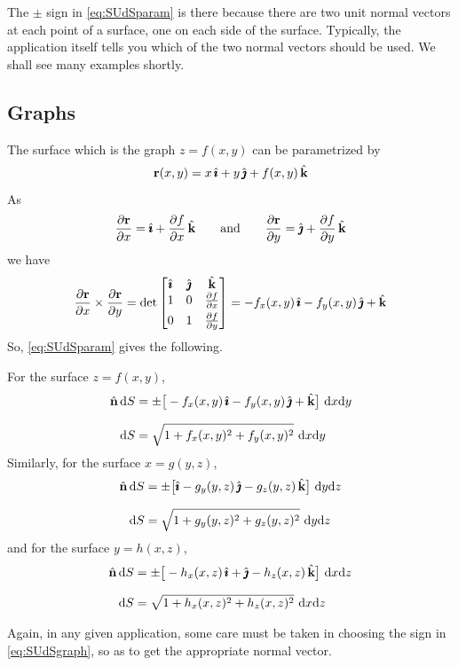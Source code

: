 \noindent
The $\pm$ sign in \eqref{eq:SUdSparam} is there because there are
two unit normal vectors at each point of a surface, one on each side of the
surface. Typically, the application itself tells you 
which of the two normal vectors should be used. We shall see many examples shortly.

\subsection{Graphs}
The surface which is the graph $z = f(x,y)$ can be parametrized
by 
\begin{equation*}
\mathbf{r}(x,y) = x\,\hat{\pmb{\imath}} + y\,\hat{\pmb{\jmath}} + f(x,y)\,\hat{\mathbf{k}}
\end{equation*} 
As
\begin{align*}
\frac{\partial\mathbf{r}}{\partial x}  
       = \hat{\pmb{\imath}} + \frac{\partial f}{\partial x}\,\hat{\mathbf{k}} \qquad\text{and}\qquad
\frac{\partial\mathbf{r}}{\partial y}  
       = \hat{\pmb{\jmath}} + \frac{\partial f}{\partial y}\,\hat{\mathbf{k}} 
\end{align*}
we have
\begin{equation*}
 \frac{\partial\mathbf{r}}{\partial x}\times
              \frac{\partial\mathbf{r}}{\partial y}
=\det\left[\begin{matrix}
           \hat{\pmb{\imath}} & \hat{\pmb{\jmath}} & \hat{\mathbf{k}} \\
           1 & 0 & \frac{\partial f}{\partial x} \\[0.05in]
           0 & 1 & \frac{\partial f}{\partial y}
           \end{matrix}\right]
= -f_x(x,y)\,\hat{\pmb{\imath}} - f_y(x,y)\,\hat{\pmb{\jmath}} + \hat{\mathbf{k}}
\end{equation*}
So, \eqref{eq:SUdSparam} gives the following.
\begin{impeqn}\label{eq:SUdSgraph}
For the surface $z=f(x,y)$,
\begin{align*}
\hn\, \dee{S} & = \pm\big[-f_x(x,y)\,\hi - f_y(x,y)\,\hj + \hk\big]\ 
          \dee{x}\dee{y} \\[0.1in]
\dee{S}&= \sqrt{1 + f_x(x,y)^2 + f_y(x,y)^2}\ 
          \dee{x}\dee{y}
\end{align*}
Similarly, for the surface $x=g(y,z)$, 
\begin{align*}
\hn\, \dee{S} & = \pm\big[\hi -g_y(y,z)\,\hj - g_z(y,z)\,\hk\big]\ 
          \dee{y}\dee{z} \\[0.1in]
\dee{S}&= \sqrt{1 + g_y(y,z)^2 + g_z(y,z)^2}\ 
          \dee{y}\dee{z}
\end{align*}
and for the surface $y=h(x,z)$,
\begin{align*}
\hn\, \dee{S} & = \pm\big[-h_x(x,z)\,\hi +\hj - h_z(x,z)\,\hk\big]\ 
          \dee{x}\dee{z} \\[0.1in]
\dee{S}&= \sqrt{1 + h_x(x,z)^2 + h_z(x,z)^2}\ 
          \dee{x}\dee{z}
\end{align*}
\end{impeqn}
\noindent
Again, in any given application, some care must be taken in choosing
the sign in \eqref{eq:SUdSgraph}, so as to get the appropriate 
normal vector.


